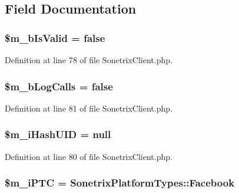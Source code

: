 \subsection{Field Documentation}
\hypertarget{classSonetrixClient_ab06d5fc246adce3ed8bb29dc52bcdd0e}{
\subsubsection[{\$m\_\-bIsValid}]{\setlength{\rightskip}{0pt plus 5cm}\$m\_\-bIsValid = false}}
\label{classSonetrixClient_ab06d5fc246adce3ed8bb29dc52bcdd0e}


Definition at line 78 of file SonetrixClient.php.

\hypertarget{classSonetrixClient_a2f73148a503cb4a30acce7c8c1b48753}{
\subsubsection[{\$m\_\-bLogCalls}]{\setlength{\rightskip}{0pt plus 5cm}\$m\_\-bLogCalls = false}}
\label{classSonetrixClient_a2f73148a503cb4a30acce7c8c1b48753}


Definition at line 81 of file SonetrixClient.php.

\hypertarget{classSonetrixClient_a3832cbb70bb294d8f8800acdb598abe1}{
\subsubsection[{\$m\_\-iHashUID}]{\setlength{\rightskip}{0pt plus 5cm}\$m\_\-iHashUID = null}}
\label{classSonetrixClient_a3832cbb70bb294d8f8800acdb598abe1}


Definition at line 80 of file SonetrixClient.php.

\hypertarget{classSonetrixClient_ab294fcb3988981bf2d504f3f3b07dd99}{
\subsubsection[{\$m\_\-iPTC}]{\setlength{\rightskip}{0pt plus 5cm}\$m\_\-iPTC = SonetrixPlatformTypes::Facebook}}
\label{classSonetrixClient_ab294fcb3988981bf2d504f3f3b07dd99}


